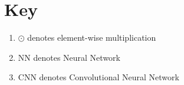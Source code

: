 \chapter*{Key}

\begin{enumerate}
    \item $\odot$ denotes element-wise multiplication
    \item NN denotes Neural Network
    \item CNN denotes Convolutional Neural Network
\end{enumerate}